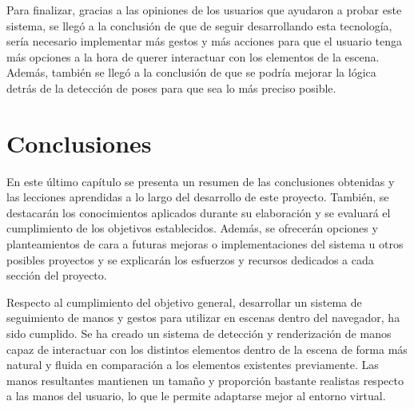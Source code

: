 \documentclass[a4paper, 12pt]{book}
\begin{document}
Para finalizar, gracias a las opiniones de los usuarios que ayudaron a probar este sistema, se llegó a la conclusión de que de seguir desarrollando esta tecnología, sería necesario implementar más gestos y más acciones para que el usuario tenga más opciones a la hora de querer interactuar con los elementos de la escena. Además, también se llegó a la conclusión de que se podría mejorar la lógica detrás de la detección de poses para que sea lo más preciso posible.


\cleardoublepage
\chapter{Conclusiones}
\label{chap:conclusiones}
En este último capítulo se presenta un resumen de las conclusiones obtenidas y las lecciones aprendidas a lo largo del desarrollo de este proyecto. También, se destacarán los conocimientos aplicados durante su elaboración y se evaluará el cumplimiento de los objetivos establecidos. Además, se ofrecerán opciones y planteamientos de cara a futuras mejoras o implementaciones del sistema u otros posibles proyectos y se explicarán los esfuerzos y recursos dedicados a cada sección del proyecto.

Respecto al cumplimiento del objetivo general, desarrollar un sistema de seguimiento de manos y gestos para utilizar en escenas dentro del navegador, ha sido cumplido. Se ha creado un sistema de detección y renderización de manos capaz de interactuar con los distintos elementos dentro de la escena de forma más natural y fluida en comparación a los elementos existentes previamente. Las manos resultantes mantienen un tamaño y proporción bastante realistas respecto a las manos del usuario, lo que le permite adaptarse mejor al entorno virtual.
\end{document}
